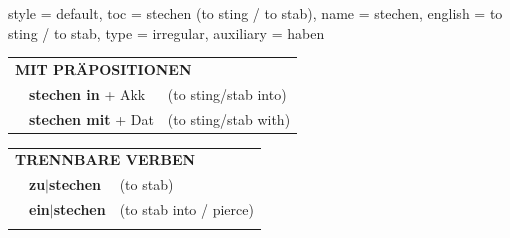 \begin{verbentry}{
  style = {default},
  toc = {stechen (to sting / to stab)},
  name = {stechen},
  english = {to sting / to stab},
  type = {irregular},
  auxiliary = {haben}
}
   \vspace{10pt}

   \begin{tabular}{lll}
      \multicolumn{3}{l}{\textbf{MIT PRÄPOSITIONEN}}\\
& \textbf{stechen in} + Akk & (to sting/stab into)\\
& \textbf{stechen mit} + Dat & (to sting/stab with)\\
\end{tabular}
  \hfill
   \begin{tabular}{lll}
      \multicolumn{3}{l}{\textbf{TRENNBARE VERBEN}}\\
 & \textbf{zu$|$stechen} & (to stab)\\
 & \textbf{ein$|$stechen} & (to stab into / pierce)\\
\vspace{10pt}
  \end{tabular}

  \vspace{-5pt}
\end{verbentry}

